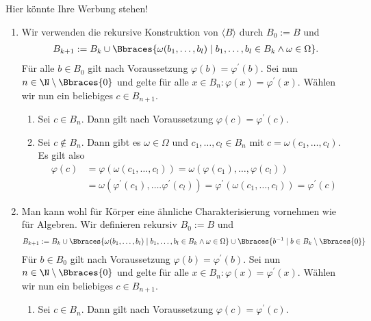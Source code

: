 \begin{solution}
    Hier könnte Ihre Werbung stehen!
    \begin{enumerate}[label = (\roman*)]
        \item Wir verwenden die rekursive Konstruktion von $\langle B \rangle$ durch $B_0 := B$ und
        \begin{align*}
            B_{k + 1} := B_k \cup \Bbraces{\omega(b_1, \dots, b_l) \mid b_1, \dots, b_l \in B_k \land \omega \in \Omega}.
        \end{align*}
        Für alle $b \in B_0$ gilt nach Voraussetzung $\varphi(b) = \varphi^\prime(b)$. Sei nun $n \in \N \setminus \Bbraces{0}$ und gelte für alle $x \in B_n: \varphi(x) = \varphi^\prime(x)$. Wählen wir nun ein beliebiges $c \in B_{n + 1}$.
        \begin{enumerate}[label = Fall \arabic*:]
            \item Sei $c \in B_n$. Dann gilt nach Voraussetzung $\varphi(c) = \varphi^\prime(c)$.
            \item Sei $c \notin B_n$. Dann gibt es $\omega \in \Omega$ und $c_1, \dots, c_l \in B_n$ mit $c = \omega(c_1, \dots, c_l)$. Es gilt also
            \begin{align*}
                \varphi(c) &= \varphi(\omega(c_1, \dots, c_l)) = \omega(\varphi(c_1), \dots, \varphi(c_l)) \\
                &= \omega(\varphi^\prime(c_1), \dots. \varphi^\prime(c_l)) = \varphi^\prime(\omega(c_1, \dots, c_l)) = \varphi^\prime(c)
            \end{align*}
        \end{enumerate}
        \item Man kann wohl für Körper eine ähnliche Charakterisierung vornehmen wie für Algebren. Wir definieren rekursiv $B_0 := B$ und
        \begin{align*}
            B_{k+1} := B_k \cup \Bbraces{\omega(b_1, \dots, b_l) \mid b_1, \dots, b_l \in B_k \land \omega \in \Omega} \cup \Bbraces{b^{-1} \mid b \in B_k \setminus \Bbraces{0}}
        \end{align*}
        Für $b \in B_0$ gilt nach Voraussetzung $\varphi(b) = \varphi^\prime(b)$. Sei nun $n \in \N \setminus \Bbraces{0}$ und gelte für alle $x \in B_n: \varphi(x) = \varphi^\prime(x)$. Wählen wir nun ein beliebiges $c \in B_{n + 1}$.
        \begin{enumerate}[label = Fall \arabic*:]
            \item Sei $c \in B_n$. Dann gilt nach Voraussetzung $\varphi(c) = \varphi^\prime(c)$.

\end{enumerate}
\end{enumerate}
\end{solution}
